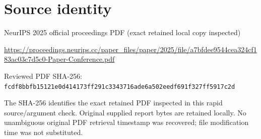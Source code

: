 \documentclass[11pt]{article}
\begin{document}
\section*{Source identity}

NeurIPS 2025 official proceedings PDF (exact retained local copy inspected)

\url{https://proceedings.neurips.cc/paper_files/paper/2025/file/a7bfdee9544cea324cf183ac03c7d5c0-Paper-Conference.pdf}

Reviewed PDF SHA-256: \nolinkurl{fcdf8bbfb15121e0d414173ff291c3343716ade6a502eedf691f327ff5917c2d}

The SHA-256 identifies the exact retained PDF inspected in this rapid source/argument check. Original supplied report bytes are retained locally. No unambiguous original PDF retrieval timestamp was recovered; file modification time was not substituted.
\end{document}
